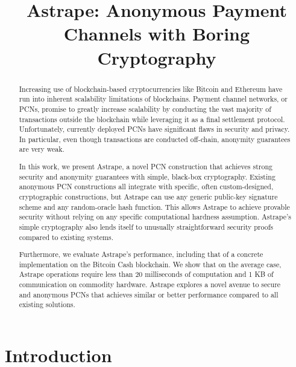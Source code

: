 \documentclass[USenglish,oneside,twocolumn]{article}
\begin{document}
\title{Astrape: Anonymous Payment Channels with Boring Cryptography}
\maketitle

\begin{abstract}
    Increasing use of blockchain-based cryptocurrencies like Bitcoin and Ethereum have run into inherent scalability limitations of blockchains. Payment channel networks, or PCNs, promise to greatly increase scalability by conducting the vast majority of transactions outside the blockchain while leveraging it as a final settlement protocol. Unfortunately, currently deployed PCNs have significant flaws in security and privacy. In particular, even though transactions are conducted off-chain, anonymity guarantees are very weak.

    In this work, we present Astrape, a novel PCN construction that achieves strong security and anonymity guarantees with simple, black-box cryptography. Existing anonymous PCN constructions all integrate with specific, often custom-designed, cryptographic constructions, but Astrape can use any generic public-key signature scheme and any random-oracle hash function. This allows Astrape to achieve provable security without relying on any specific computational hardness assumption. Astrape's simple cryptography also lends itself to unusually straightforward security proofs compared to existing systems.

    Furthermore, we evaluate Astrape's performance, including that of a concrete implementation on the Bitcoin Cash blockchain. We show that on the average case, Astrape operations require less than 20 milliseconds of computation and 1 KB of communication on commodity hardware. Astrape explores a novel avenue to secure and anonymous PCNs that achieves similar or better performance compared to all existing solutions.
\end{abstract}

\section{Introduction}
\end{document}

